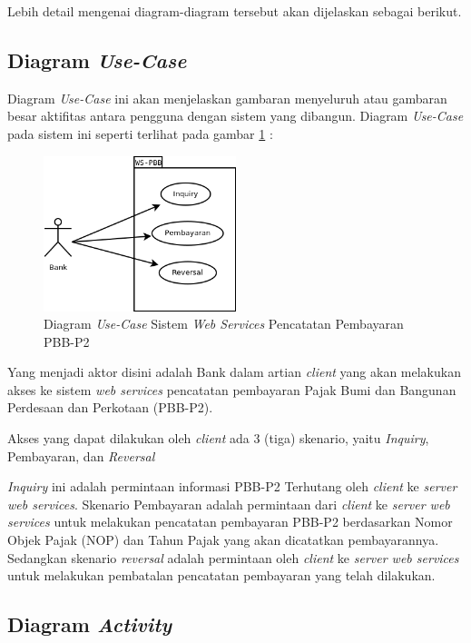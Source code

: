 \documentclass[pdftex,12pt, oneside]{article}
\begin{document}
Lebih detail mengenai diagram-diagram tersebut akan dijelaskan sebagai berikut.


\subsection{Diagram \textit{Use-Case}}

Diagram \textit{Use-Case} ini akan menjelaskan gambaran menyeluruh atau gambaran besar aktifitas antara pengguna dengan sistem yang dibangun. Diagram \textit{Use-Case} pada sistem ini seperti terlihat pada gambar \ref{fig:uml-use-case} :

\begin{figure}[H]
  \centering
  \includegraphics[width=0.5\textwidth]{./resources/uml/uml-use-case}
  \caption{Diagram \textit{Use-Case} Sistem \textit{Web Services} Pencatatan Pembayaran PBB-P2}
  \label{fig:uml-use-case}
\end{figure}

Yang menjadi aktor disini adalah Bank dalam artian \textit{client} yang akan melakukan akses ke sistem \textit{web services} pencatatan pembayaran Pajak Bumi dan Bangunan Perdesaan dan Perkotaan (PBB-P2).

Akses yang dapat dilakukan oleh \textit{client} ada 3 (tiga) skenario, yaitu \textit{Inquiry}, Pembayaran, dan \textit{Reversal}

\textit{Inquiry} ini adalah permintaan informasi PBB-P2 Terhutang oleh \textit{client} ke \textit{server web services}. Skenario Pembayaran adalah permintaan dari \textit{client} ke \textit{server web services} untuk melakukan pencatatan pembayaran PBB-P2 berdasarkan Nomor Objek Pajak (NOP) dan Tahun Pajak yang akan dicatatkan pembayarannya. Sedangkan skenario \textit{reversal} adalah permintaan oleh \textit{client} ke \textit{server web services} untuk melakukan pembatalan pencatatan pembayaran yang telah dilakukan.

\subsection{Diagram \textit{Activity}}
\end{document}
